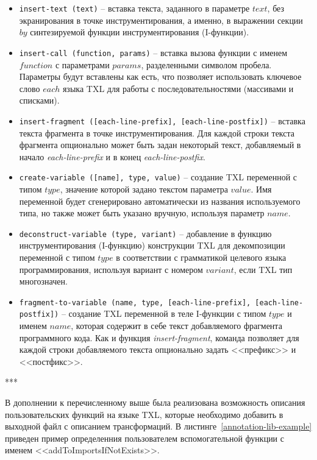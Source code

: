 \begin{itemize}[noitemsep]
  \item \lstinline{insert-text (text)} --
  вставка текста, заданного в параметре $text$, без экранирования в точке инструментирования, а именно, в выражении секции $by$ синтезируемой функции инструментирования (I-функции).

  \item \lstinline{insert-call (function, params)} --
  вставка вызова функции с именем $function$ с параметрами $params$, разделенными символом пробела. Параметры будут вставлены как есть, что позволяет использовать ключевое слово $each$ языка TXL для работы с последовательностями (массивами и списками).

  \item \lstinline{insert-fragment ([each-line-prefix], [each-line-postfix])} --
  вставка текста фрагмента в точке инструментирования. Для каждой строки текста фрагмента опционально может быть задан некоторый текст, добавляемый в начало \textit{each-line-prefix} и в конец \textit{each-line-postfix}.

  \item \lstinline{create-variable ([name], type, value)} --
  создание TXL переменной с типом $type$, значение которой задано текстом параметра $value$. Имя переменной будет сгенерировано автоматически из названия используемого типа, но также может быть указано вручную, используя параметр $name$.

  \item \lstinline{deconstruct-variable (type, variant)} --
  добавление в функцию инструментирования (I-функцию) конструкции TXL для декомпозиции переменной с типом $type$ в соответствии с грамматикой целевого языка программирования, используя вариант с номером $variant$, если TXL тип многозначен.

  \item \lstinline{fragment-to-variable (name, type, [each-line-prefix], [each-line-postfix])} --
  создание TXL переменной в теле I-функции с типом $type$ и именем $name$, которая содержит в себе текст добавляемого фрагмента программного кода. Как и функция \textit{insert-fragment}, команда позволяет для каждой строки добавляемого текста опционально задать <<префикс>> и <<постфикс>>.
\end{itemize}

***

В дополнении к перечисленному выше была реализована возможность описания пользовательских функций на языке TXL, которые необходимо добавить в выходной файл с описанием трансформаций.
В листинге~\ref{annotation-lib-example} приведен пример определенния пользователем вспомогательной функции с именем <<addToImportsIfNotExists>>.

